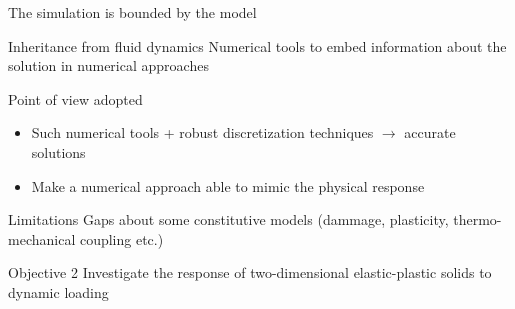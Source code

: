\begin{frame}{The simulation is bounded by the model}
  \begin{block}{Inheritance from fluid dynamics}
    Numerical tools to embed information about the solution in numerical approaches
  \end{block}
  \begin{block}{Point of view adopted}
    \begin{itemize}
    \item Such numerical tools + robust discretization techniques $\rightarrow$ accurate solutions
    \item Make a numerical approach able to mimic the physical response
    \end{itemize}
  \end{block}
  \begin{block}{Limitations}
    Gaps about some constitutive models (dammage, plasticity, thermo-mechanical coupling etc.)
  \end{block}
  \begin{block}{Objective 2}
    Investigate the response of two-dimensional elastic-plastic solids to dynamic loading
  \end{block}
\end{frame}



